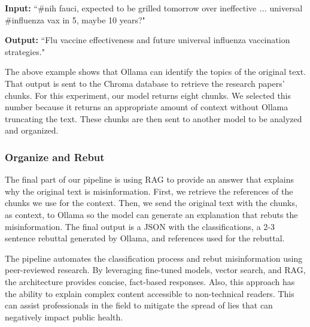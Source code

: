 {\footnotesize %
\begin{tcolorbox}[colback=gray!5,colframe=black!50,boxrule=0.4pt,arc=2pt,left=0.5mm,right=0.5mm,top=0.1mm,bottom=0.1mm,title=Example]
\textbf{Input:}  
``\#nih fauci, expected to be grilled tomorrow over ineffective \textit{...} universal \#influenza vax in 5, maybe 10 years?"

\vspace{0.25em}
\textbf{Output:}  
``Flu vaccine effectiveness and future universal influenza vaccination strategies."
\end{tcolorbox}
}
\indent The above example shows that Ollama can identify the topics of the original text. That output is sent to the Chroma database to retrieve the research papers' chunks. For this experiment, our model returns eight chunks. We selected
this number because it returns an appropriate amount of context without Ollama truncating the text. These chunks are then sent to another model to be analyzed and organized.

\subsubsection{Organize and Rebut}
The final part of our pipeline is using RAG to provide an answer that explains why the original text is misinformation. First, we retrieve the references of the chunks we use for the context. Then, we send the original text with the chunks, as context, to Ollama so the model can generate an explanation that rebuts the misinformation. The final output is a JSON with the classifications, a 2-3 sentence rebuttal generated by Ollama, and references used for the rebuttal.


The pipeline automates the classification process and rebut misinformation using peer-reviewed research. By leveraging fine-tuned models, vector search, and RAG, the architecture provides concise, fact-based responses. Also, this
approach has the ability to explain complex content accessible to non-technical readers. This can assist professionals in the field to mitigate the spread of lies that can negatively impact public health.


